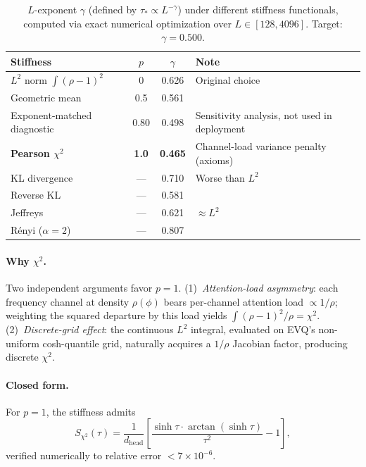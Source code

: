 \begin{table}[ht]
\caption{$L$-exponent $\gamma$ (defined by $\tau_* \propto L^{-\gamma}$) under different stiffness functionals, computed via exact numerical optimization over $L \in [128, 4096]$. Target: $\gamma = 0.500$.}
\label{tab:stiffness-sweep}
\centering
\small
\begin{tabular}{@{}l c c l@{}}
\toprule
Stiffness & $p$ & $\gamma$ & Note \\
\midrule
$L^2$ norm $\int(\rho{-}1)^2$ & 0 & 0.626 & Original choice \\
Geometric mean & 0.5 & 0.561 & \\
Exponent-matched diagnostic & 0.80 & 0.498 & Sensitivity analysis, not used in deployment \\
\textbf{Pearson $\chi^2$} & \textbf{1.0} & \textbf{0.465} & Channel-load variance penalty (axioms) \\
\midrule
KL divergence & --- & 0.710 & Worse than $L^2$ \\
Reverse KL & --- & 0.581 & \\
Jeffreys & --- & 0.621 & $\approx L^2$ \\
R\'enyi ($\alpha{=}2$) & --- & 0.807 & \\
\bottomrule
\end{tabular}
\end{table}

\paragraph{Why $\chi^2$.} Two independent arguments favor $p{=}1$. (1)~\emph{Attention-load asymmetry}: each frequency channel at density $\rho(\phi)$ bears per-channel attention load ${\propto}1/\rho$; weighting the squared departure by this load yields $\int(\rho{-}1)^2/\rho = \chi^2$. (2)~\emph{Discrete-grid effect}: the continuous $L^2$ integral, evaluated on EVQ's non-uniform cosh-quantile grid, naturally acquires a $1/\rho$ Jacobian factor, producing discrete $\chi^2$.

\paragraph{Closed form.} For $p{=}1$, the stiffness admits
\begin{equation}
S_{\chi^2}(\tau) = \frac{1}{d_{\mathrm{head}}}\!\left[\frac{\sinh\tau\cdot\arctan(\sinh\tau)}{\tau^2} - 1\right],
\end{equation}
verified numerically to relative error ${<}7{\times}10^{-6}$.

